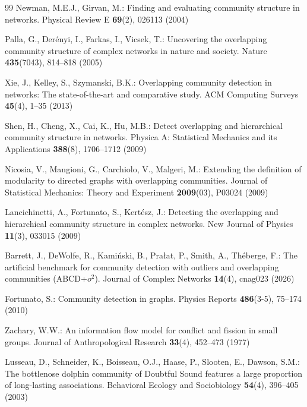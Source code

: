 \documentclass{svproc}
\begin{document}
\begin{thebibliography}{99}
Newman, M.E.J., Girvan, M.: Finding and evaluating community structure in networks. Physical Review E \textbf{69}(2), 026113 (2004)

Palla, G., Der{\'e}nyi, I., Farkas, I., Vicsek, T.: Uncovering the overlapping community structure of complex networks in nature and society. Nature \textbf{435}(7043), 814--818 (2005)

Xie, J., Kelley, S., Szymanski, B.K.: Overlapping community detection in networks: The state-of-the-art and comparative study. ACM Computing Surveys \textbf{45}(4), 1--35 (2013)

Shen, H., Cheng, X., Cai, K., Hu, M.B.: Detect overlapping and hierarchical community structure in networks. Physica A: Statistical Mechanics and its Applications \textbf{388}(8), 1706--1712 (2009)

Nicosia, V., Mangioni, G., Carchiolo, V., Malgeri, M.: Extending the definition of modularity to directed graphs with overlapping communities. Journal of Statistical Mechanics: Theory and Experiment \textbf{2009}(03), P03024 (2009)

Lancichinetti, A., Fortunato, S., Kert{\'e}sz, J.: Detecting the overlapping and hierarchical community structure in complex networks. New Journal of Physics \textbf{11}(3), 033015 (2009)

Barrett, J., DeWolfe, R., Kami{\'n}ski, B., Pra{\l}at, P., Smith, A., Th{\'e}berge, F.: The artificial benchmark for community detection with outliers and overlapping communities (ABCD+$o^2$). Journal of Complex Networks \textbf{14}(4), cnag023 (2026)

Fortunato, S.: Community detection in graphs. Physics Reports \textbf{486}(3-5), 75--174 (2010)

Zachary, W.W.: An information flow model for conflict and fission in small groups. Journal of Anthropological Research \textbf{33}(4), 452--473 (1977)

Lusseau, D., Schneider, K., Boisseau, O.J., Haase, P., Slooten, E., Dawson, S.M.: The bottlenose dolphin community of Doubtful Sound features a large proportion of long-lasting associations. Behavioral Ecology and Sociobiology \textbf{54}(4), 396--405 (2003)


\end{thebibliography}
\end{document}
